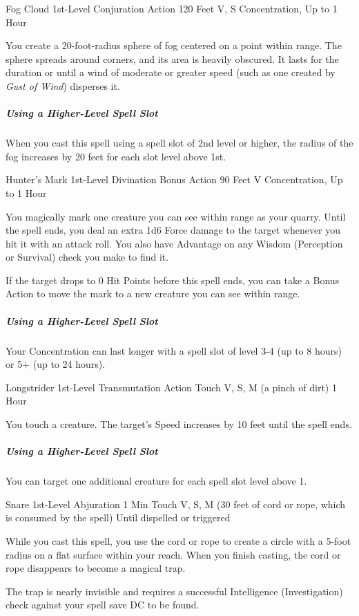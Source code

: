 \documentclass[letterpaper,openany,oneside,twocolumn]{book}
\begin{document}
\DndSpellHeader
  {Fog Cloud}
  {1st-Level Conjuration}
  {Action}
  {120 Feet}
  {V, S}
  {Concentration, Up to 1 Hour}

You create a 20-foot-radius sphere of fog centered on a point within range. The sphere spreads around corners, and its area is heavily obscured. It lasts for the duration or until a wind of moderate or greater speed (such as one created by \textit{Gust of Wind}) disperses it.

\subparagraph*{Using a Higher-Level Spell Slot} When you cast this spell using a spell slot of 2nd level or higher, the radius of the fog increases by 20 feet for each slot level above 1st.

\DndSpellHeader
  {Hunter's Mark}
  {1st-Level Divination}
  {Bonus Action}
  {90 Feet}
  {V}
  {Concentration, Up to 1 Hour}

You magically mark one creature you can see within range as your quarry. Until the spell ends, you deal an extra 1d6 Force damage to the target whenever you hit it with an attack roll. You also have Advantage on any Wisdom (Perception or Survival) check you make to find it.

If the target drops to 0 Hit Points before this spell ends, you can take a Bonus Action to move the mark to a new creature you can see within range.

\subparagraph*{Using a Higher-Level Spell Slot} Your Concentration can last longer with a spell slot of level 3-4 (up to 8 hours) or 5+ (up to 24 hours).

\DndSpellHeader
  {Longstrider}
  {1st-Level Transmutation}
  {Action}
  {Touch}
  {V, S, M (a pinch of dirt)}
  {1 Hour}

You touch a creature. The target's Speed increases by 10 feet until the spell ends.

\subparagraph*{Using a Higher-Level Spell Slot} You can target one additional creature for each spell slot level above 1.

\DndSpellHeader
  {Snare}
  {1st-Level Abjuration}
  {1 Min}
  {Touch}
  {V, S, M (30 feet of cord or rope, which is consumed by the spell)}
  {Until dispelled or triggered}

While you cast this spell, you use the cord or rope to create a circle with a 5-foot radius on a flat surface within your reach. When you finish casting, the cord or rope disappears to become a magical trap.

The trap is nearly invisible and requires a successful Intelligence (Investigation) check against your spell save DC to be found.
\end{document}
